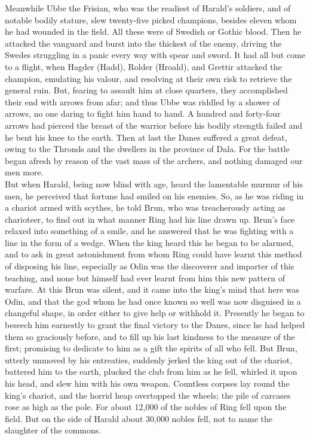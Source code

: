 \documentclass[10pt,a4paper]{report}
\begin{document}
Meanwhile Ubbe the Frisian, who was the readiest of Harald's soldiers, and of notable bodily stature, slew twenty-five picked champions, besides eleven whom he had wounded in the field. All these were of Swedish or Gothic blood. Then he attacked the vanguard and burst into the thickest of the enemy, driving the Swedes struggling in a panic every way with spear and sword. It had all but come to a flight, when Hagder (Hadd), Rolder (Hroald), and Grettir attacked the champion, emulating his valour, and resolving at their own risk to retrieve the general ruin. But, fearing to assault him at close quarters, they accomplished their end with arrows from afar; and thus Ubbe was riddled by a shower of arrows, no one daring to fight him hand to hand. A hundred and forty-four arrows had pierced the breast of the warrior before his bodily strength failed and he bent his knee to the earth. Then at last the Danes suffered a great defeat, owing to the Thronds and the dwellers in the province of Dala. For the battle began afresh by reason of the vast mass of the archers, and nothing damaged our men more.\\

But when Harald, being now blind with age, heard the lamentable murmur of his men, he perceived that fortune had smiled on his enemies. So, as he was riding in a chariot armed with scythes, he told Brun, who was treacherously acting as charioteer, to find out in what manner Ring had his line drawn up. Brun's face relaxed into something of a smile, and he answered that he was fighting with a line in the form of a wedge. When the king heard this he began to be alarmed, and to ask in great astonishment from whom Ring could have learnt this method of disposing his line, especially as Odin was the discoverer and imparter of this teaching, and none but himself had ever learnt from him this new pattern of warfare. At this Brun was silent, and it came into the king's mind that here was Odin, and that the god whom he had once known so well was now disguised in a changeful shape, in order either to give help or withhold it. Presently he began to beseech him earnestly to grant the final victory to the Danes, since he had helped them so graciously before, and to fill up his last kindness to the measure of the first; promising to dedicate to him as a gift the spirits of all who fell. But Brun, utterly unmoved by his entreaties, suddenly jerked the king out of the chariot, battered him to the earth, plucked the club from him as he fell, whirled it upon his head, and slew him with his own weapon. Countless corpses lay round the king's chariot, and the horrid heap overtopped the wheels; the pile of carcases rose as high as the pole. For about 12,000 of the nobles of Ring fell upon the field. But on the side of Harald about 30,000 nobles fell, not to name the slaughter of the commons.\\
\end{document}
